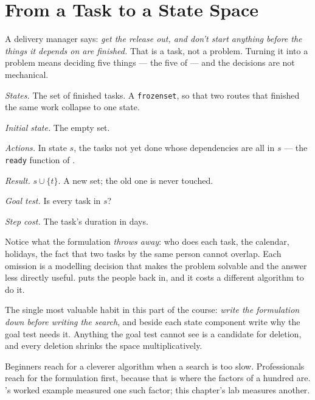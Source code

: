 \section{From a Task to a State Space}

A delivery manager says: \emph{get the release out, and don't start anything before
the things it depends on are finished.} That is a task, not a problem. Turning it
into a problem means deciding five things --- the five of  --- and
the decisions are not mechanical.

\begin{examplebox}
\begin{tight}
  \item \emph{States.} The set of finished tasks. A \texttt{frozenset}, so that two
        routes that finished the same work collapse to one state.
  \item \emph{Initial state.} The empty set.
  \item \emph{Actions.} In state $s$, the tasks not yet done whose dependencies are
        all in $s$ --- the \texttt{ready} function of .
  \item \emph{Result.} $s \cup \{t\}$. A new set; the old one is never touched.
  \item \emph{Goal test.} Is every task in $s$?
  \item \emph{Step cost.} The task's duration in days.
\end{tight}
\end{examplebox}

Notice what the formulation \emph{throws away}: who does each task, the calendar,
holidays, the fact that two tasks by the same person cannot overlap. Each omission
is a modelling decision that makes the problem solvable and the answer less
directly useful.  puts the people back in, and it costs a different
algorithm to do it.

\begin{conceptbox}
The single most valuable habit in this part of the course: \emph{write the
formulation down before writing the search}, and beside each state component write
why the goal test needs it. Anything the goal test cannot see is a candidate for
deletion, and every deletion shrinks the space multiplicatively.

Beginners reach for a cleverer algorithm when a search is too slow. Professionals
reach for the formulation first, because that is where the factors of a hundred
are. 's worked example measured one such factor; this chapter's lab
measures another.
\end{conceptbox}


